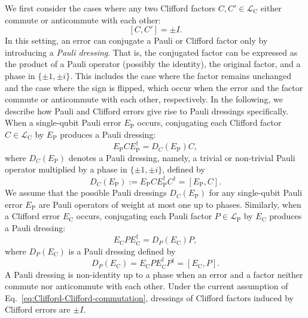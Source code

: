 \documentclass[
 reprint,
 amsmath,amssymb,
 pra,superscriptaddress, nofootinbib
]{revtex4-2}
\theoremstyle{definition}
\theoremstyle{plain}
\begin{document}
We first consider the cases where any two Clifford factors $C, C' \in\mathcal L_{\mathrm{C}}$ either commute or anticommute with each other:
\begin{equation}
  \label{eq:Clifford-Clifford-commutation}
  [C,C']=\pm I.
\end{equation}
In this setting, an error can conjugate a Pauli or Clifford factor only by introducing a \emph{Pauli dressing}.
That is, the conjugated factor can be expressed as the product of a Pauli operator (possibly the identity), the original factor, and a phase in $\{\pm 1, \pm i\}$.
This includes the case where the factor remains unchanged and the case where the sign is flipped, which occur when the error and the factor commute or anticommute with each other, respectively. 
In the following, we describe how Pauli and Clifford errors give rise to Pauli dressings specifically. When a single-qubit Pauli error $E_\mathrm{P}$ occurs, conjugating each Clifford factor $C\in\mathcal{L}_\mathrm{C}$ by $E_\mathrm{P}$ produces a Pauli dressing:
\begin{equation}
  E_\mathrm{P} CE_\mathrm{P}^\dagger = D_C(E_\mathrm{P})C,
  \label{eq:dressed_clifford_factor}
\end{equation}
where $D_C(E_\mathrm{P})$ denotes a Pauli dressing, namely, a trivial or non-trivial Pauli operator multiplied by a phase in $\{\pm 1,\pm i\}$, defined by
\begin{equation}
  \label{eq:dressing_Pauli_error}
  D_C(E_\mathrm{P}):=E_\mathrm{P} CE_\mathrm{P}^\dagger C^\dagger=[E_\mathrm{P}, C].
\end{equation}
We assume that the possible Pauli dressings $D_C(E_\mathrm{P})$ for any single-qubit Pauli error $E_\mathrm{P}$ are Pauli operators of weight at most one up to phases.
Similarly, when a Clifford error $E_\mathrm{C}$ occurs, conjugating each Pauli factor $P \in \mathcal{L}_\mathrm{P}$ by $E_\mathrm{C}$ produces a Pauli dressing:
\begin{equation}
  E_\mathrm{C} P E_\mathrm{C}^\dagger=D_P(E_\mathrm{C})P, 
  \label{eq:dressed_pauli_factor}
\end{equation}
where $D_P(E_\mathrm{C})$ is a Pauli dressing defined by
\begin{equation}
  \label{eq:dressing_Clifford_error}
  D_P(E_\mathrm{C})=E_\mathrm{C}PE_\mathrm{C}^\dagger P^\dagger=[E_\mathrm{C},P].
\end{equation}
A Pauli dressing is non-identity up to a phase when an error and a factor neither commute nor anticommute with each other.
Under the current assumption of Eq.~\eqref{eq:Clifford-Clifford-commutation}, dressings of Clifford factors induced by Clifford errors are $\pm I$.
\end{document}
